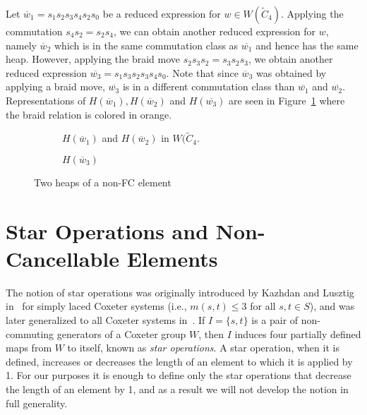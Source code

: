 \begin{example}
Let $\overline{w}_1=s_1s_2s_3s_4s_2s_0$ be a reduced expression for $w \in W(\widetilde{C}_4)$. Applying the commutation $s_4s_2=s_2s_4$, we can obtain another reduced expression for $w$, namely $\overline{w}_2$ which is in the same commutation class as $\overline{w_1}$ and hence has the same heap. However, applying the braid move $s_2s_3s_2=s_3s_2s_3$, we obtain another reduced expression $\overline{w_3}=s_1s_3s_2s_3s_4s_0$. Note that since $\overline{w}_3$ was obtained by applying a braid move, $\overline{w_3}$ is in a different commutation class than $\overline{w_1}$ and $\overline{w_2}$. Representations of $H(\overline{w}_1), H(\overline{w}_2)$ and $H(\overline{w_3})$ are seen in Figure~\ref{fig:not FC} where the braid relation is colored in orange.

\begin{figure}[h]
\centering
\begin{subfigure}[b]{0.3\textwidth}	
\centering
{}
\caption{$H(\overline{w}_1)$ and $H(\overline{w}_2)$ in $W(\widetilde{C}_4$.}
\end{subfigure}
\begin{subfigure}[b]{0.3\textwidth}	
\centering
{}
\caption{$H(\overline{w}_3)$}
\end{subfigure}
\caption{Two heaps of a non-FC element}	
\label{fig:not FC}
\end{figure}
\end{example}




\section{Star Operations and Non-Cancellable Elements}\label{Star}

The notion of star operations was originally introduced by Kazhdan and Lusztig in~\cite{Kazhdan1979} for simply laced Coxeter systems (i.e., $m(s,t) \leq 3$ for all $s,t \in S$), and was later generalized to all Coxeter systems in~\cite{Lusztig1985}. If $I=\{s,t\}$ is a pair of non-commuting generators of a Coxeter group $W$, then $I$ induces four partially defined maps from $W$ to itself, known as \emph{star operations}. A star operation, when it is defined, increases or decreases the length of an element to which it is applied by 1. For our purposes it is enough to define only the star operations that decrease the length of an element by 1, and as a result we will not develop the notion in full generality.

